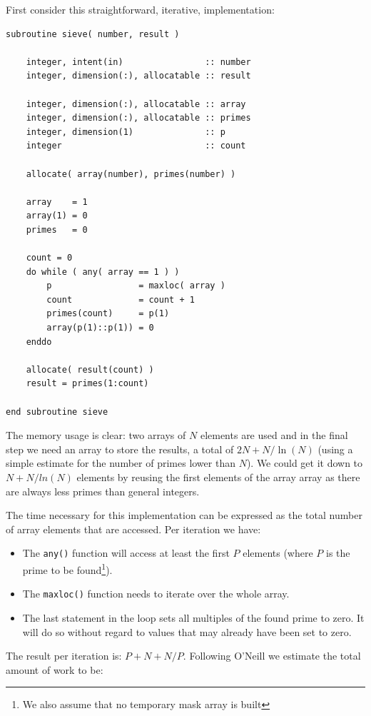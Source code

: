 \documentclass[onecolumn]{article}
\begin{document}
First consider this straightforward, iterative, implementation:

\begin{verbatim}
subroutine sieve( number, result )

    integer, intent(in)                :: number
    integer, dimension(:), allocatable :: result

    integer, dimension(:), allocatable :: array
    integer, dimension(:), allocatable :: primes
    integer, dimension(1)              :: p
    integer                            :: count

    allocate( array(number), primes(number) )

    array    = 1
    array(1) = 0
    primes   = 0

    count = 0
    do while ( any( array == 1 ) )
        p                 = maxloc( array )
        count             = count + 1
        primes(count)     = p(1)
        array(p(1)::p(1)) = 0
    enddo

    allocate( result(count) )
    result = primes(1:count)

end subroutine sieve
\end{verbatim}

The memory usage is clear: two arrays of $N$ elements are used and in the final step we need an array to store the
results, a total of $2N + N/\ln(N)$ (using a simple estimate for the number of primes lower than $N$).
We could get it down to $N + N/ln(N)$ elements by reusing the first elements of the array array as there are
always less primes than general integers.

The time necessary for this implementation can be expressed as the total number of array elements that are accessed. Per iteration we have:

\begin{itemize}
\item   The \verb+any()+ function will access at least the first $P$ elements (where $P$ is the prime to be found\footnote{We also assume that no temporary mask array is built}).
\item   The \verb+maxloc()+ function needs to iterate over the whole array.
\item   The last statement in the loop sets all multiples of the found prime to zero. It will do so without regard to values that may already have been set to zero.
\end{itemize}

The result per iteration is: $P + N + N/P$. Following O'Neill we estimate the total amount of work to be:
\end{document}
